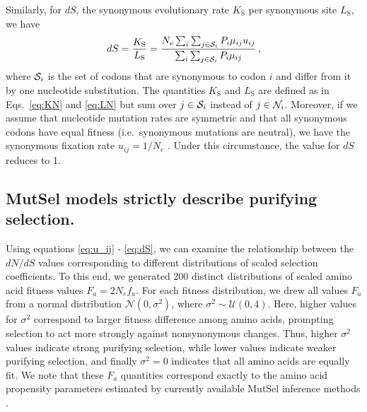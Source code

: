 \documentclass[11pt]{article}
\begin{document}
Similarly, for $dS$, the synonymous evolutionary rate $K_\text{S}$ per synonymous site $L_\text{S}$, we have
\begin{equation}\label{eq:dS}
	dS = \frac{K_\text{S}}{L_\text{S}}=\frac{ N_e \sum_i \sum_{j \in {\cal S}_i} P_i \mu_{ij} u_{ij} } {\sum_i \sum_{j \in {\cal S}_i} P_i \mu_{ij} }\,,
\end{equation}
where ${\cal S}_i$ is the set of codons that are synonymous to codon $i$ and differ from it by one nucleotide substitution. The quantities $K_\text{S}$ and $L_\text{S}$ are defined as in Eqs.~\eqref{eq:KN} and \eqref{eq:LN} but sum over $j\in {\cal S}_i$ instead of $j\in {\cal N}_i$. Moreover, if we assume that nucleotide mutation rates are symmetric and that all synonymous codons have equal fitness (i.e.\ synonymous mutations are neutral), we have the synonymous fixation rate $u_{ij}= 1/N_e$ \cite{CrowKimura1970}. Under this circumstance, the value for $dS$ reduces to 1.
		
				
\subsection*{MutSel models strictly describe purifying selection.}

Using equations \eqref{eq:u_ij} - \eqref{eq:dS}, we can examine the relationship between the $dN/dS$ values corresponding to different distributions of scaled selection coefficients. To this end, we generated 200 distinct distributions of scaled amino acid fitness values $F_a = 2N_ef_a$. For each fitness distribution, we drew all values $F_a$ from a normal distribution $\mathcal{N}(0,\sigma^2)$, where $\sigma^2 \sim \mathcal{U}(0,4)$. Here, higher values for $\sigma^2$ correspond to larger fitness difference among amino acids, prompting selection to act more strongly against nonsynonymous changes. Thus, higher $\sigma^2$ values indicate strong purifying selection, while lower values indicate weaker purifying selection, and finally $\sigma^2 = 0$ indicates that all amino acids are equally fit. We note that these $F_a$ quantities correspond exactly to the amino acid propensity parameters estimated by currently available MutSel inference methods \cite{RodrigueLartillot2014,Tamurietal2014}.
\end{document}
